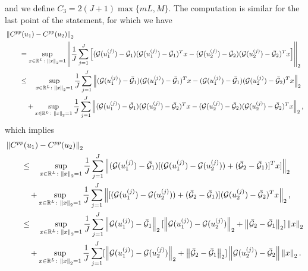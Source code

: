 and we define $C_3 = 2 (J+1) \max \{ mL, M \}$. The computation is similar for the last point of the statement, for which we have
\begin{align*}
& \left\|C^{pp}(u_1) - C^{pp}(u_2)\right\|_2 \\
& \qquad = \sup_{x \in \mathbb{R}^L \colon \left\|x\right\|_2 = 1} \left \lVert \frac{1}{J} \sum_{j=1}^J \left [ (\mathcal{G}(u_1^{(j)}) - \bar{\mathcal{G}}_1) (\mathcal{G}(u_1^{(j)}) - \bar{\mathcal{G}}_1)^T x - (\mathcal{G}(u_2^{(j)}) - \bar{\mathcal{G}}_2) (\mathcal{G}(u_2^{(j)}) - \bar{\mathcal{G}}_2)^T x \right ] \right \rVert_2 \\
& \qquad \le \quad \sup_{x \in \mathbb{R}^L \colon \left\|x\right\|_2 = 1} \frac{1}{J} \sum_{j=1}^J \left \lVert (\mathcal{G}(u_1^{(j)}) - \bar{\mathcal{G}}_1) (\mathcal{G}(u_1^{(j)}) - \bar{\mathcal{G}}_1)^T x - (\mathcal{G}(u_1^{(j)}) - \bar{\mathcal{G}}_1) (\mathcal{G}(u_2^{(j)}) - \bar{\mathcal{G}}_2)^T x \right \rVert_2 \\
& \qquad \quad + \sup_{x \in \mathbb{R}^L \colon \left\|x\right\|_2 = 1} \frac{1}{J} \sum_{j=1}^J \left \lVert (\mathcal{G}(u_1^{(j)}) - \bar{\mathcal{G}}_1) (\mathcal{G}(u_2^{(j)}) - \bar{\mathcal{G}}_2)^T x - (\mathcal{G}(u_2^{(j)}) - \bar{\mathcal{G}}_2) (\mathcal{G}(u_2^{(j)}) - \bar{\mathcal{G}}_2)^T x \right \rVert_2, 
\end{align*}
which implies
\begin{align*}
& \left\|C^{pp}(u_1) - C^{pp}(u_2)\right\|_2 \\
& \qquad \le \quad \sup_{x \in \mathbb{R}^L \colon \left\|x\right\|_2 = 1} \frac{1}{J} \sum_{j=1}^J \left \lVert (\mathcal{G}(u_1^{(j)}) - \bar{\mathcal{G}}_1) [ (\mathcal{G}(u_1^{(j)}) - \mathcal{G}(u_2^{(j)})) + (\bar{\mathcal{G}}_2 - \bar{\mathcal{G}}_1)]^T x ] \right \rVert_2 \\
& \qquad \quad + \sup_{x \in \mathbb{R}^L \colon \left\|x\right\|_2 = 1} \frac{1}{J} \sum_{j=1}^J \left \lVert [ (\mathcal{G}(u_1^{(j)}) - \mathcal{G}(u_2^{(j)})) + (\bar{\mathcal{G}}_2 - \bar{\mathcal{G}}_1) ] (\mathcal{G}(u_2^{(j)}) - \bar{\mathcal{G}}_2)^T x \right \rVert_2 , \\
& \qquad \le \quad \sup_{x \in \mathbb{R}^L \colon \left\|x\right\|_2 = 1} \frac{1}{J} \sum_{j=1}^J \left\|\mathcal{G}(u_1^{(j)}) - \bar{\mathcal{G}}_1\right\|_2 [ \left\|\mathcal{G}(u_1^{(j)}) - \mathcal{G}(u_2^{(j)})\right\|_2 + \left\|\bar{\mathcal{G}}_2 - \bar{\mathcal{G}}_1\right\|_2 ] \left\|x\right\|_2 \\
& \qquad \quad + \sup_{x \in \mathbb{R}^L \colon \left\|x\right\|_2 = 1} \frac{1}{J} \sum_{j=1}^J [ \left\|\mathcal{G}(u_1^{(j)}) - \mathcal{G}(u_2^{(j)})\right\|_2 + \left\|\bar{\mathcal{G}}_2 - \bar{\mathcal{G}}_1\right\|_2 ] \left\|\mathcal{G}(u_2^{(j)}) - \bar{\mathcal{G}}_2\right\| \left\|x\right\|_2.
\end{align*}
